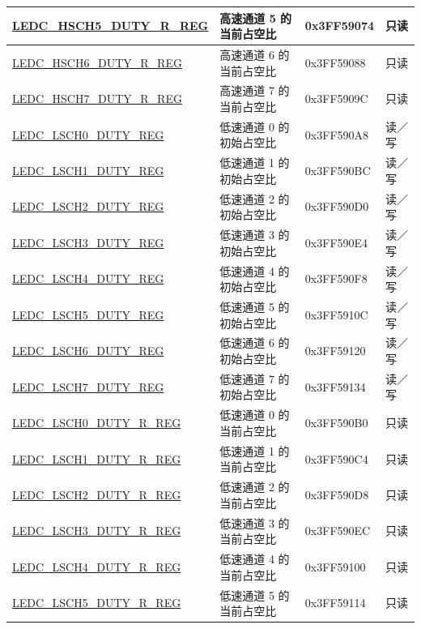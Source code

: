 \begin{longtable}{ | p{5cm} | p{7cm} | p{2.2cm} | p{1.2cm} | }
\hyperref[regdesc:LEDCHSCHnDUTYRREG]{LEDC\_HSCH5\_DUTY\_R\_REG} & 高速通道 5 的当前占空比 & 0x3FF59074 & 只读 \\ \hline
\hyperref[regdesc:LEDCHSCHnDUTYRREG]{LEDC\_HSCH6\_DUTY\_R\_REG} & 高速通道 6 的当前占空比 & 0x3FF59088 & 只读 \\ \hline
\hyperref[regdesc:LEDCHSCHnDUTYRREG]{LEDC\_HSCH7\_DUTY\_R\_REG} & 高速通道 7 的当前占空比 & 0x3FF5909C & 只读 \\ \hline
\hyperref[regdesc:LEDCLSCHnDUTYREG]{LEDC\_LSCH0\_DUTY\_REG} & 低速通道 0 的初始占空比 & 0x3FF590A8 & 读／写 \\ \hline
\hyperref[regdesc:LEDCLSCHnDUTYREG]{LEDC\_LSCH1\_DUTY\_REG} & 低速通道 1 的初始占空比 & 0x3FF590BC & 读／写 \\ \hline
\hyperref[regdesc:LEDCLSCHnDUTYREG]{LEDC\_LSCH2\_DUTY\_REG} & 低速通道 2 的初始占空比 & 0x3FF590D0 & 读／写 \\ \hline
\hyperref[regdesc:LEDCLSCHnDUTYREG]{LEDC\_LSCH3\_DUTY\_REG} & 低速通道 3 的初始占空比 & 0x3FF590E4 & 读／写 \\ \hline
\hyperref[regdesc:LEDCLSCHnDUTYREG]{LEDC\_LSCH4\_DUTY\_REG} & 低速通道 4 的初始占空比 & 0x3FF590F8 & 读／写 \\ \hline
\hyperref[regdesc:LEDCLSCHnDUTYREG]{LEDC\_LSCH5\_DUTY\_REG} & 低速通道 5 的初始占空比 & 0x3FF5910C & 读／写 \\ \hline
\hyperref[regdesc:LEDCLSCHnDUTYREG]{LEDC\_LSCH6\_DUTY\_REG} & 低速通道 6 的初始占空比 & 0x3FF59120 & 读／写 \\ \hline
\hyperref[regdesc:LEDCLSCHnDUTYREG]{LEDC\_LSCH7\_DUTY\_REG} & 低速通道 7 的初始占空比 & 0x3FF59134 & 读／写 \\ \hline
\hyperref[regdesc:LEDCLSCHnDUTYRREG]{LEDC\_LSCH0\_DUTY\_R\_REG} & 低速通道 0 的当前占空比 & 0x3FF590B0 & 只读 \\ \hline
\hyperref[regdesc:LEDCLSCHnDUTYRREG]{LEDC\_LSCH1\_DUTY\_R\_REG} & 低速通道 1 的当前占空比 & 0x3FF590C4 & 只读 \\ \hline
\hyperref[regdesc:LEDCLSCHnDUTYRREG]{LEDC\_LSCH2\_DUTY\_R\_REG} & 低速通道 2 的当前占空比 & 0x3FF590D8 & 只读\\ \hline
\hyperref[regdesc:LEDCLSCHnDUTYRREG]{LEDC\_LSCH3\_DUTY\_R\_REG} & 低速通道 3 的当前占空比 & 0x3FF590EC & 只读 \\ \hline
\hyperref[regdesc:LEDCLSCHnDUTYRREG]{LEDC\_LSCH4\_DUTY\_R\_REG} & 低速通道 4 的当前占空比 & 0x3FF59100 & 只读 \\ \hline
\hyperref[regdesc:LEDCLSCHnDUTYRREG]{LEDC\_LSCH5\_DUTY\_R\_REG} & 低速通道 5 的当前占空比 & 0x3FF59114 & 只读 \\ \hline

\end{longtable}

